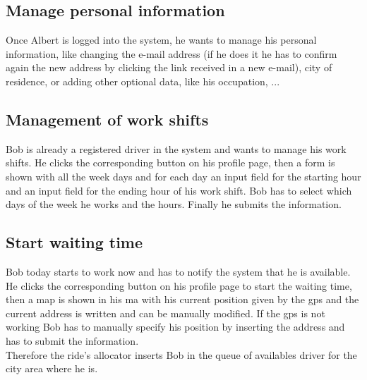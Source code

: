 \subsection{Manage personal information} 
Once Albert is logged into the system, he wants to manage his personal information, like changing the e-mail address (if he does it he has to confirm again the new address by clicking the link received in a new e-mail), city of residence, or adding other optional data, like his occupation, ...

\subsection{Management of work shifts}
Bob is already a registered \gls{driver} in the system and wants to manage his work shifts. He clicks the corresponding button on his profile page, then a form is shown with all the week days and for each day an input field for the starting hour and an input field for the ending hour of his work shift. Bob has to select which days of the week he works and the hours. Finally he submits the information.

\subsection{Start waiting time}
Bob today starts to work now and has to notify the system that he is available. He clicks the corresponding button on his profile page to start the waiting time, then a \gls{map} is shown in his \gls{ma} with his current position given by the \gls{gps} and the current address is written and can be manually modified. If the \gls{gps} is not working Bob has to manually specify his position by inserting the address and has to submit the information.\\
Therefore the ride's allocator inserts Bob in the queue of availables \gls{driver} for the city area where he is.

